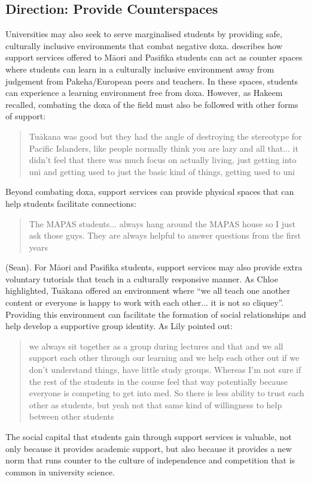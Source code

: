 \subsection{Direction: Provide Counterspaces}


Universities may also seek to serve marginalised students by providing safe, culturally inclusive environments that combat negative doxa. \cite{mayeda2014you} describes how support services offered to M\={a}ori and Pasifika students can act as counter spaces where students can learn in a culturally inclusive environment away from judgement from Pakeha/European peers and teachers. In these spaces, students can experience a learning environment free from doxa. However, as Hakeem recalled, combating the doxa of the field must also be followed with other forms of support: \blockquote{Tu\={a}kana was good but they had the angle of destroying the stereotype for Pacific Islanders, like people normally think you are lazy and all that... it didn't feel that there was much focus on actually living, just getting into uni and getting used to just the basic kind of things, getting used to uni} Beyond combating doxa, support services can provide physical spaces that can help students facilitate connections: \blockquote{The MAPAS students... always hang around the MAPAS house so I just ask those guys. They are always helpful to answer questions from the first years} (Sean). For M\={a}ori and Pasifika students, support services may also provide extra voluntary tutorials that teach in a culturally responsive manner. As Chloe highlighted, Tu\={a}kana offered an environment where ``we all teach one another content or everyone is happy to work with each other...  it is not so cliquey''. Providing this environment can facilitate the formation of social relationships and help develop a supportive group identity. As Lily pointed out: \blockquote{we always sit together as a group during lectures and that and we all support each other through our learning and we help each other out if we don’t understand things, have little study groups. Whereas I’m not sure if the rest of the students in the course feel that way potentially because everyone is competing to get into med. So there is less ability to trust each other as students, but yeah not that same kind of willingness to help between other students}. The social capital that students gain through support services is valuable, not only because it provides academic support, but also because it provides a new norm that runs counter to the culture of independence and competition that is common in university science.

